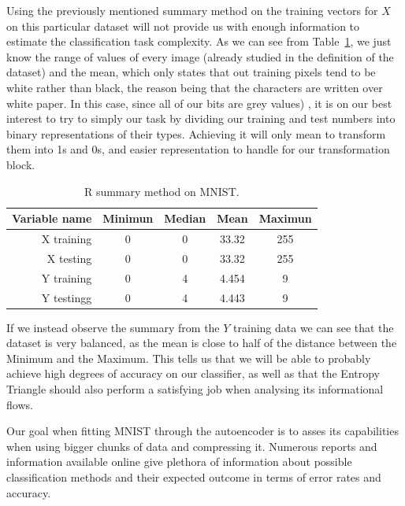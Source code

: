 Using the previously mentioned summary method on the training vectors for $X$ on this particular dataset will not provide us with enough information to estimate the classification task complexity. As we can see from Table~\ref{tab:table_MNIST}, we just know the range of values of every image (already studied in the definition of the dataset) and the mean, which only states that out training pixels tend to be white rather than black, the reason being that the characters are written over white paper. In this case, since all of our bits are grey values)
, it is on our best interest to try to simply our task by dividing our training and test numbers into binary representations of their types. Achieving it will only mean to transform them into 1s and 0s, and easier representation to handle for our transformation block. 
%
\begin{table}[H]
	\caption{R summary method on MNIST.}
	\begin{center}
		\label{tab:table_MNIST}
		\begin{tabular}{r|c|c|c|c} %
			\textbf{Variable name} & \textbf{Minimun} & \textbf{Median} & \textbf{Mean} & \textbf{Maximun}\\
			\hline
			X training & 0 & 0 & 33.32 & 255 \\
			X testing  & 0 & 0 & 33.32 & 255 \\
		    Y training & 0 & 4 & 4.454 & 9 \\
		    Y testingg & 0 & 4 & 4.443 & 9 \\
		\end{tabular}
	\end{center}
\end{table}


If we instead observe the summary from the $Y$ training data we can see that the dataset is very balanced, as the mean is close to half of the distance between the Minimum and the Maximum. This tells us that we will be able to probably achieve high degrees of accuracy on our classifier, as well as that the Entropy Triangle should also perform a satisfying job when analysing its informational flows.  \par

Our goal when fitting MNIST  through the autoencoder is to asses its capabilities when using bigger chunks of data and compressing it. Numerous reports and information available online give plethora of information about possible classification methods and their expected outcome in terms of error rates and accuracy. 
%


